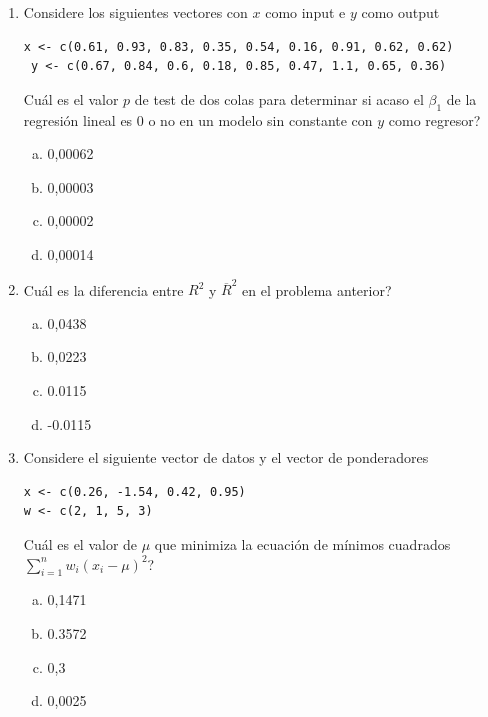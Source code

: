 \documentclass[11pt,oneside,spanish]{article}
\theoremstyle{definition}
\theoremstyle{definition}\newtheorem{definicion}{Definicin}
\theoremstyle{definition}\newtheorem{ejemplo}{Ejemplo}
\theoremstyle{remark}\newtheorem{nota}{\textsc{Nota}}
\theoremstyle{definition}\newtheorem{proposicion}{Proposicin}
\theoremstyle{definition}\newtheorem{problema}{Problema}
\begin{document}
\begin{enumerate}[(1)]

\item Considere los siguientes vectores con $x$ como input e $y$ como output
\begin{lstlisting}[backgroundcolor=\color{Gray!20},frame=none,basicstyle=\ttfamily]
 x <- c(0.61, 0.93, 0.83, 0.35, 0.54, 0.16, 0.91, 0.62, 0.62)
 y <- c(0.67, 0.84, 0.6, 0.18, 0.85, 0.47, 1.1, 0.65, 0.36)
\end{lstlisting}
{\textquestiondown}Cu\'al es el valor $p$ de test de dos colas para determinar si acaso el $\beta_1$ de la regresi\'on lineal es 0 o no en un modelo sin constante con $y$ como regresor?
	\begin{enumerate}[(a)]
	\item 0,00062
	\item 0,00003
	\item 0,00002
	\item 0,00014
	\end{enumerate}
	
\item {\textquestiondown}Cu\'al es la diferencia entre $R^2$ y $\overline{R}^2$ en el problema anterior?
	\begin{enumerate}[(a)]
	\item 0,0438
	\item 0,0223
	\item 0.0115
	\item -0.0115
	\end{enumerate}	

\item Considere el siguiente vector de datos y el vector de ponderadores
\begin{lstlisting}[backgroundcolor=\color{Gray!20},frame=none,basicstyle=\ttfamily]
x <- c(0.26, -1.54, 0.42, 0.95)
w <- c(2, 1, 5, 3)
\end{lstlisting}
{\textquestiondown}Cu\'al es el valor de $\mu$ que minimiza la ecuaci\'on de m\'inimos cuadrados $\sum_{i=1}^n w_i(x_i-\mu)^2$?
	\begin{enumerate}[(a)]
	\item 0,1471
	\item 0.3572
	\item 0,3
	\item 0,0025
	\end{enumerate}
	

\end{enumerate}
\end{document}
